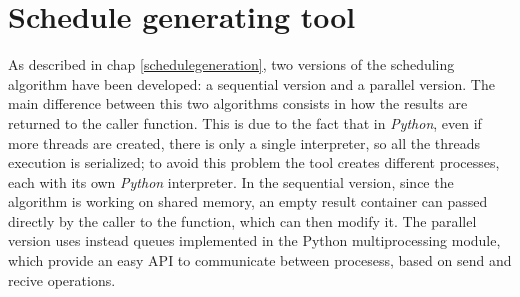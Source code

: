 \documentclass[a4paper,11pt,oneside]{book}
\begin{document}
\section{Schedule generating tool}

As described in chap \ref{schedulegeneration}, two versions of the scheduling algorithm have been developed: a sequential version and a parallel version. The main difference between this two algorithms consists in how the results are returned to the caller function. This is due to the fact that in \emph{Python}, even if more threads are created, there is only a single interpreter, so all the threads execution is serialized; to avoid this problem the tool creates different processes, each with its own \emph{Python} interpreter. In the sequential version, since the algorithm is working on shared memory, an empty result container can passed directly by the caller to the function, which can then modify it. The parallel version uses instead queues implemented in the Python multiprocessing module, which provide an easy API to communicate between procesess, based on send and recive operations. 
\end{document}
